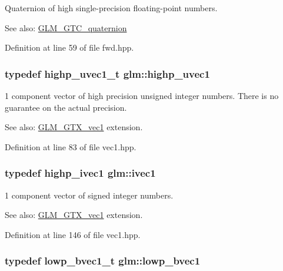 Quaternion of high single-precision floating-point numbers.

\begin{Desc}
\item[See also:]\hyperlink{group__gtc__quaternion}{GLM\_\-GTC\_\-quaternion} \end{Desc}


Definition at line 59 of file fwd.hpp.\hypertarget{namespaceglm_2a480125ab05aa522d883651ea1101f8}{
\subsubsection[highp\_\-uvec1]{\setlength{\rightskip}{0pt plus 5cm}typedef highp\_\-uvec1\_\-t {\bf glm::highp\_\-uvec1}}}
\label{namespaceglm_2a480125ab05aa522d883651ea1101f8}


1 component vector of high precision unsigned integer numbers. There is no guarantee on the actual precision. \begin{Desc}
\item[See also:]\hyperlink{group__gtx__vec1}{GLM\_\-GTX\_\-vec1} extension. \end{Desc}


Definition at line 83 of file vec1.hpp.\hypertarget{namespaceglm_946031cea0c22745848ebd873e6facb0}{
\subsubsection[ivec1]{\setlength{\rightskip}{0pt plus 5cm}typedef {\bf highp\_\-ivec1} {\bf glm::ivec1}}}
\label{namespaceglm_946031cea0c22745848ebd873e6facb0}


1 component vector of signed integer numbers. \begin{Desc}
\item[See also:]\hyperlink{group__gtx__vec1}{GLM\_\-GTX\_\-vec1} extension. \end{Desc}


Definition at line 146 of file vec1.hpp.\hypertarget{namespaceglm_f22d6a46a35bcda63801fe78c033f35f}{
\subsubsection[lowp\_\-bvec1]{\setlength{\rightskip}{0pt plus 5cm}typedef lowp\_\-bvec1\_\-t {\bf glm::lowp\_\-bvec1}}}
\label{namespaceglm_f22d6a46a35bcda63801fe78c033f35f}



